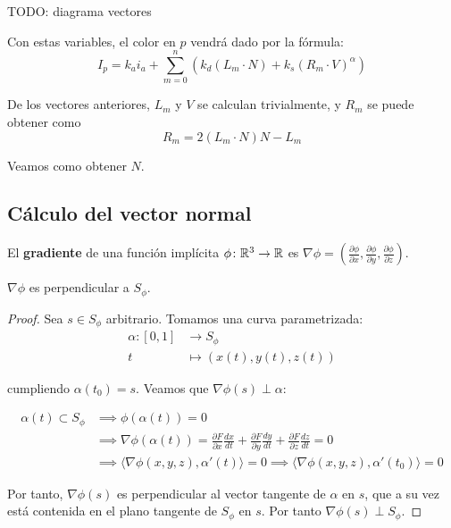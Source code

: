 TODO: diagrama vectores

Con estas variables, el color en $p$ vendrá dado por la fórmula:
\begin{equation*}
  I_p = k_a i_a + \sum_{m=0}^{n} \left(k_d\left(L_m\cdot N\right) + k_s\left(R_m\cdot V\right)^{\alpha} \right)
\end{equation*}

De los vectores anteriores, $L_m$ y $V$ se calculan trivialmente, y $R_m$ se puede obtener como
\begin{equation*}
  R_m = 2(L_m\cdot N)N - L_m
\end{equation*}

Veamos como obtener $N$.

\subsection{Cálculo del vector normal}
\begin{definicion}
  El \textbf{gradiente} de una función implícita $\phi\colon \mathbb{R}^3\to\mathbb{R}$ es $\nabla\phi = \left(\frac{\partial \phi}{\partial x}, \frac{\partial \phi}{\partial y}, \frac{\partial \phi}{\partial z}\right)$.
\end{definicion}

\begin{proposicion}\label{p:gradient_perp}
  $\nabla\phi$ es perpendicular a $S_\phi$.
\end{proposicion}

\begin{proof}
  Sea $s\in S_\phi$ arbitrario. Tomamos una curva parametrizada:
  \begin{align*}
    \alpha \colon [0,1] & \to S_\phi                             \\
    t                   & \mapsto \left(x(t), y(t), z(t) \right)
  \end{align*}

  cumpliendo $\alpha(t_0)=s$. Veamos que $\nabla\phi(s) \perp \alpha$:

  \begin{align*}
    \alpha(t)\subset S_\phi & \implies \phi(\alpha(t))=0\\
                            & \implies \nabla\phi(\alpha(t)) = \frac{\partial{F}}{\partial{x}}\frac{dx}{dt} + \frac{\partial{F}}{\partial{y}}\frac{dy}{dt} + \frac{\partial{F}}{\partial{z}}\frac{dz}{dt} = 0 \\
                            & \implies \langle \nabla\phi(x,y,z), \alpha'(t)\rangle = 0 \implies \langle \nabla\phi(x,y,z), \alpha'(t_0)\rangle = 0
  \end{align*}

    Por tanto, $\nabla\phi(s)$ es perpendicular al vector tangente de $\alpha$ en $s$, que a su vez está contenida en el plano tangente de $S_\phi$ en $s$. Por tanto $\nabla\phi(s) \perp S_\phi$.
\end{proof}

